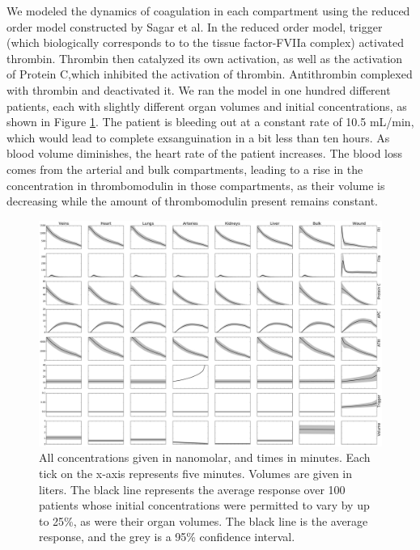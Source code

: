 \documentclass[12pt]{article}
\begin{document}
 We modeled the dynamics of coagulation in each compartment using the reduced order model constructed by Sagar et al.\cite{sagar2015dynamic} In the reduced order model, trigger (which biologically corresponds to to the tissue factor-FVIIa complex) activated thrombin. Thrombin then catalyzed its own activation, as well as the activation of Protein C,which inhibited the activation of thrombin. Antithrombin complexed with thrombin and deactivated it. We ran the model in one hundred different patients, each with slightly different organ volumes and initial concentrations, as shown in Figure \ref{fig:demoPBPK}. The patient is bleeding out at a constant rate of 10.5 mL/min, which would lead to complete exsanguination in a bit less than ten hours. As blood volume diminishes, the heart rate of the patient increases. The blood loss comes from the arterial and bulk compartments, leading to a rise in the concentration in thrombomodulin in those compartments, as their volume is decreasing while the amount of thrombomodulin present remains constant.
\begin{figure}
        \includegraphics[width=\textwidth]{figures/DifferingInitialVolumesAndConditionsPrettyDiffContraction}
        \caption{\scriptsize All concentrations given in nanomolar, and times in minutes. Each tick on the x-axis represents five minutes. Volumes are given in liters. The black line represents the average response over 100 patients whose initial concentrations were permitted to vary by up to 25\%, as were their organ volumes. The black line is the average response, and the grey is a 95\% confidence interval.}
        \label{fig:demoPBPK}
\end{figure}
\end{document}
